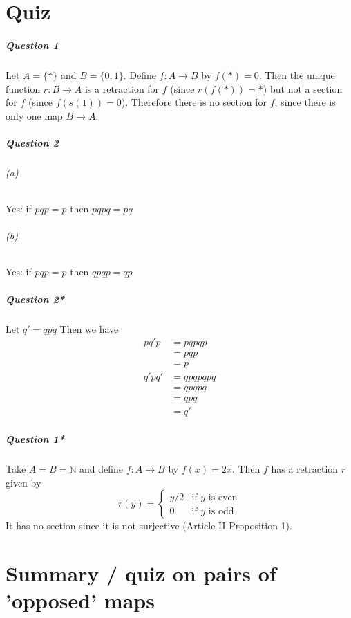 \documentclass{report}
\begin{document}
    \chapter{Quiz}

    \paragraph{Question 1}
    Let $A = \{ * \}$ and $B = \{ 0,1 \}$. Define $f : A \rightarrow B$ by $f(*) = 0$. Then the unique
    function $r : B \rightarrow A$ is a retraction for $f$ (since $r(f(*)) = *$) but not a section for $f$
    (since $f(s(1)) = 0$). Therefore there is no section for $f$, since there is only one map $B \rightarrow A$.

    \paragraph{Question 2}
    \subparagraph{(a)}
    Yes: if $pqp = p$ then $pqpq = pq$
    \subparagraph{(b)}
    Yes: if $pqp = p$ then $qpqp = qp$

    \paragraph{Question 2*}
    Let $q' = qpq$ Then we have
    \begin{align*}
        pq'p & = pqpqp \\
        & = pqp \\
        & = p \\
        q'pq' & = qpqpqpq \\
        & = qpqpq \\
        & = qpq \\
        & = q'
    \end{align*}

    \paragraph{Question 1*}
    Take $A = B = \mathbb{N}$ and define $f : A \rightarrow B$ by $f(x) = 2x$. Then $f$ has a retraction
    $r$ given by
    \[ r(y) = \begin{cases}
        y/2 & \text{if $y$ is even} \\
        0 & \text{if $y$ is odd}
    \end{cases} \]
    It has no section since it is not surjective (Article II Proposition 1).

    \chapter{Summary / quiz on pairs of 'opposed' maps}
\end{document}
